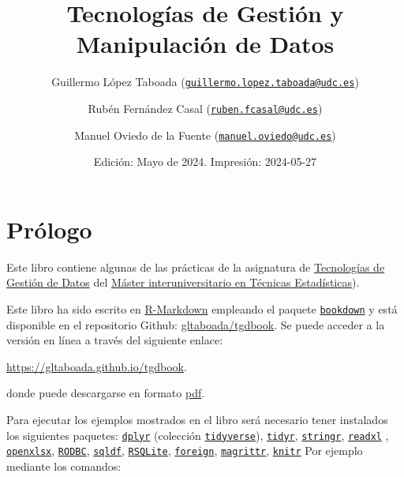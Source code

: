 \documentclass[
]{book}
\title{Tecnologías de Gestión y Manipulación de Datos}
\author{Guillermo López Taboada (\href{mailto:guillermo.lopez.taboada@udc.es}{\nolinkurl{guillermo.lopez.taboada@udc.es}}) \and Rubén Fernández Casal (\href{mailto:ruben.fcasal@udc.es}{\nolinkurl{ruben.fcasal@udc.es}}) \and Manuel Oviedo de la Fuente (\href{mailto:manuel.oviedo@udc.es}{\nolinkurl{manuel.oviedo@udc.es}})}
\date{Edición: Mayo de 2024. Impresión: 2024-05-27}
\begin{document}
\maketitle

{
\setcounter{tocdepth}{1}
\tableofcontents
}
\hypertarget{pruxf3logo}{%
\chapter*{Prólogo}\label{pruxf3logo}}

Este libro contiene algunas de las prácticas de la asignatura de \href{http://eamo.usc.es/pub/mte/index.php/es/?option=com_content\&view=article\&id=2202\&idm=38\&a\%C3\%B1o=2020}{Tecnologías de Gestión de Datos} del \href{http://eio.usc.es/pub/mte}{Máster interuniversitario en Técnicas Estadísticas}).

Este libro ha sido escrito en \href{http://rmarkdown.rstudio.com}{R-Markdown} empleando el paquete \href{https://bookdown.org/yihui/bookdown/}{\texttt{bookdown}} y está disponible en el repositorio Github: \href{https://github.com/gltaboada/tgdbook}{gltaboada/tgdbook}.
Se puede acceder a la versión en línea a través del siguiente enlace:

\url{https://gltaboada.github.io/tgdbook}.

donde puede descargarse en formato \href{https://gltaboada.github.io/tgdbook/Practicas_de_TGD.pdf}{pdf}.

Para ejecutar los ejemplos mostrados en el libro será necesario tener instalados los siguientes paquetes:
\href{https://dplyr.tidyverse.org}{\texttt{dplyr}} (colección \href{https://www.tidyverse.org/}{\texttt{tidyverse}}),
\href{https://tidyr.tidyverse.org}{\texttt{tidyr}},
\href{https://stringr.tidyverse.org}{\texttt{stringr}},
\href{https://readxl.tidyverse.org}{\texttt{readxl}} ,
\href{https://cran.r-project.org/web/packages/openxlsx/index.html}{\texttt{openxlsx}}, \href{https://cran.r-project.org/web/packages/RODBC/index.html}{\texttt{RODBC}},
\href{https://cran.r-project.org/web/packages/sqldf/index.html}{\texttt{sqldf}},
\href{https://r-dbi.github.io/RSQLite}{\texttt{RSQLite}},
\href{https://cran.r-project.org/web/packages/foreign/index.html}{\texttt{foreign}},
\href{https://cran.r-project.org/web/packages/magrittr/index.html}{\texttt{magrittr}},
\href{https://yihui.name/knitr}{\texttt{knitr}}
Por ejemplo mediante los comandos:
\end{document}
